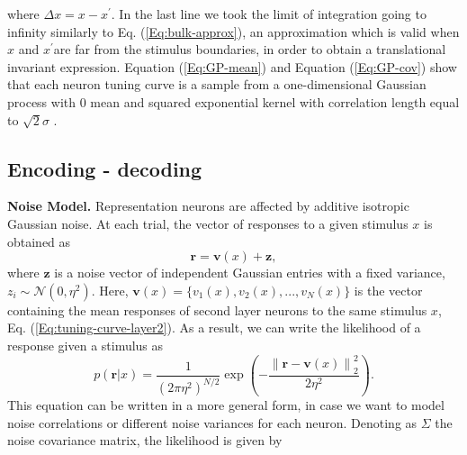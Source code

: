 \documentclass[a4paper]{article}%
\begin{document}
where $\Delta x = x -x^{\prime}$. In the last line we took the limit of
integration going to infinity similarly to Eq. (\ref{Eq:bulk-approx}), an
approximation which is valid when $x$ and $x^{\prime}$are far from the
stimulus boundaries, in order to obtain a translational invariant expression.
Equation (\ref{Eq:GP-mean}) and Equation (\ref{Eq:GP-cov}) show that each
neuron tuning curve is a sample from a one-dimensional Gaussian process with 0
mean and squared exponential kernel with correlation length equal to $\sqrt
{2}\sigma$ \cite{Rasmussen2004GaussianLearning}. \newline\newline

\subsection*{Encoding - decoding}

\textbf{Noise Model.} Representation neurons are affected by additive
isotropic Gaussian noise. At each trial, the vector of responses to a given
stimulus $x$ is obtained as
\begin{equation}
\mathbf{r} = \mathbf{v}(x) + \mathbf{z }, \label{Eq:r}%
\end{equation}
where $\mathbf{z}$ is a noise vector of independent Gaussian entries with a
fixed variance, $z_{i} \sim\mathcal{N}(0,\eta^{2})$. Here, $\mathbf{v}(x) =
\{v_{1}(x),v_{2}(x),...,v_{N}(x)\}$ is the vector containing the mean
responses of second layer neurons to the same stimulus $x$, Eq.
(\ref{Eq:tuning-curve-layer2}). As a result, we can write the likelihood of a
response given a stimulus as
\begin{equation}
p\left(  \mathbf{r}|x\right)  = \frac{1}{\left(  2\pi\eta^{2}\right)  ^{N/2}}
\exp\left(  - \frac{\left\|  \mathbf{r}-\mathbf{v}(x)\right\|  _{2}^{2}}
{2\eta^{2}} \right)  . \label{Eq:L}%
\end{equation}
This equation can be written in a more general form, in case we want to model
noise correlations or different noise variances for each neuron. Denoting as
$\Sigma$ the noise covariance matrix, the likelihood is given by%
\end{document}
